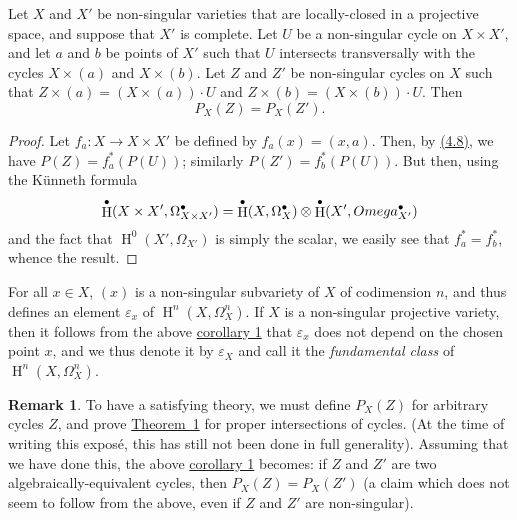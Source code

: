 \documentclass{article}
\theoremstyle{plain}
\newenvironment{corollary}[1]
  {\renewcommand\theinnercorollary{#1}\innercorollary}
  {\endinnercorollary}
\theoremstyle{definition}
\newtheorem*{remark}{Remark}
\DeclareMathOperator{\HH}{H}
\newcommand{\oldpage}[1]{\marginpar{\footnotesize$\Big\vert$ \textit{p.~#1}}}
\begin{document}
\oldpage{149-13}
\begin{corollary}{1}
\label{theorem1corollary1}
  Let $X$ and $X'$ be non-singular varieties that are locally-closed in a projective space, and suppose that $X'$ is complete.
  Let $U$ be a non-singular cycle on $X\times X'$, and let $a$ and $b$ be points of $X'$ such that $U$ intersects transversally with the cycles $X\times(a)$ and $X\times(b)$.
  Let $Z$ and $Z'$ be non-singular cycles on $X$ such that $Z\times(a)=(X\times(a))\cdot U$ and $Z\times(b)=(X\times(b))\cdot U$.
  Then
  \[
    P_X(Z) = P_X(Z').
  \]
\end{corollary}

\begin{proof}
  Let $f_a\colon X\to X\times X'$ be defined by $f_a(x)=(x,a)$.
  Then, by \hyperref[4.8]{(4.8)}, we have $P(Z)=f_a^*(P(U))$; similarly $P(Z')=f_b^*(P(U))$.
  But then, using the K\"{u}nneth formula
  \[
    \HH^\bullet(X\times X',\Omega_{X\times X'}^\bullet)
    = \HH^\bullet(X,\Omega_X^\bullet)\otimes\HH^\bullet(X',\\Omega_{X'}^\bullet)
  \]
  and the fact that $\HH^0(X',\Omega_{X'})$ is simply the scalar, we easily see that $f_a^*=f_b^*$, whence the result.
\end{proof}

For all $x\in X$, $(x)$ is a non-singular subvariety of $X$ of codimension $n$, and thus defines an element $\varepsilon_x$ of $\HH^n(X,\Omega_X^n)$.
If $X$ is a non-singular projective variety, then it follows from the above \hyperref[theorem1corollary1]{corollary 1} that $\varepsilon_x$ does not depend on the chosen point $x$, and we thus denote it by $\varepsilon_X$ and call it the \emph{fundamental class} of $\HH^n(X,\Omega_X^n)$.

\begin{remark}
\label{section4remark}
  To have a satisfying theory, we must define $P_X(Z)$ for arbitrary cycles $Z$, and prove \hyperref[theorem1]{Theorem~1} for proper intersections of cycles.
  (At the time of writing this expos\'{e}, this has still not been done in full generality).
  Assuming that we have done this, the above \hyperref[theorem1corollary1]{corollary 1} becomes: if $Z$ and $Z'$ are two algebraically-equivalent cycles, then $P_X(Z)=P_X(Z')$ (a claim which does not seem to follow from the above, even if $Z$ and $Z'$ are non-singular).
\end{remark}
\end{document}
